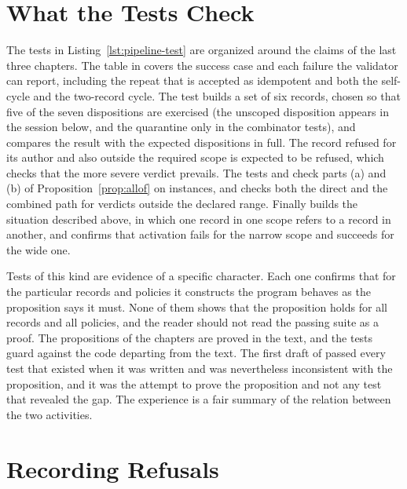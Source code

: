 
\section{What the Tests Check}

The tests in Listing~\ref{lst:pipeline-test} are organized around the claims of the last three chapters. The table in  covers the success case and each failure the validator can report, including the repeat that is accepted as idempotent and both the self-cycle and the two-record cycle. The test  builds a set of six records, chosen so that five of the seven dispositions are exercised (the unscoped disposition appears in the session below, and the quarantine only in the combinator tests), and compares the result with the expected dispositions in full. The record refused for its author and also outside the required scope is expected to be refused, which checks that the more severe verdict prevails. The tests  and  check parts (a) and (b) of Proposition~\ref{prop:allof} on instances, and  checks both the direct and the combined path for verdicts outside the declared range. Finally  builds the situation described above, in which one record in one scope refers to a record in another, and confirms that activation fails for the narrow scope and succeeds for the wide one.

Tests of this kind are evidence of a specific character. Each one confirms that for the particular records and policies it constructs the program behaves as the proposition says it must. None of them shows that the proposition holds for all records and all policies, and the reader should not read the passing suite as a proof. The propositions of the chapters are proved in the text, and the tests guard against the code departing from the text. The first draft of  passed every test that existed when it was written and was nevertheless inconsistent with the proposition, and it was the attempt to prove the proposition and not any test that revealed the gap. The experience is a fair summary of the relation between the two activities.

\section{Recording Refusals}

